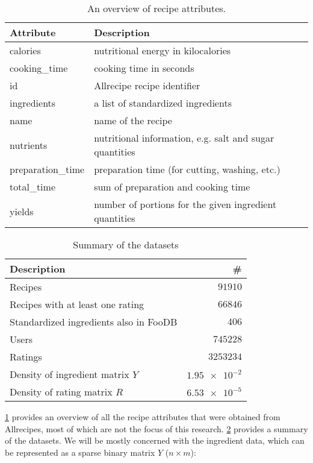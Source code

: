 \begin{table}[htbp]
	\caption{An overview of recipe attributes.}
	\label{tab:recipe_attributes}
	
	\centering
	\begin{tabular}{l l}
		\toprule
		\textbf{Attribute} & \textbf{Description} \\
		\midrule
		calories & nutritional energy in kilocalories \\
 		cooking\_time & cooking time in seconds \\
 		id & Allrecipe recipe identifier \\
 		ingredients & a list of standardized ingredients \\
 		name & name of the recipe \\
 		nutrients & nutritional information, e.g. salt and sugar quantities \\
 		preparation\_time & preparation time (for cutting, washing, etc.) \\
 		total\_time & sum of preparation and cooking time \\
 		yields & number of portions for the given ingredient quantities \\
 	\bottomrule
	\end{tabular}
\end{table}

\begin{table}[htbp]
	\caption{Summary of the datasets}
	\label{tab:dataset_summary}
	
	\centering
	\begin{tabular}{l r}
		\toprule
		\textbf{Description} & \textbf{\#} \\
		\midrule
		Recipes & $\num{91910}$ \\
		Recipes with at least one rating & $\num{66846}$ \\
		Standardized ingredients also in FooDB & $\num{406}$ \\
		Users & $\num{745228}$ \\
		Ratings & $\num{3253234}$ \\ 
		Density of ingredient matrix $Y$ & $\num{1.95e-2}$ \\
		Density of rating matrix $R$ & $\num{6.53e-5}$ \\
		\bottomrule
	\end{tabular}
\end{table}


\cref{tab:recipe_attributes} provides an overview of all the recipe attributes that were obtained from Allrecipes, most of which are not the focus of this research.
\cref{tab:dataset_summary} provides a summary of the datasets.
We will be mostly concerned with the ingredient data, which can be represented as a sparse binary matrix $Y$ ($n \times m$):

